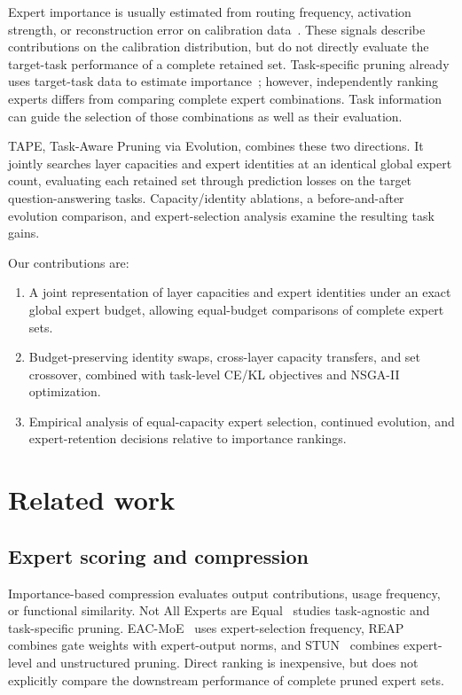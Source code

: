 \documentclass{article}
\begin{document}
Expert importance is usually estimated from routing frequency, activation strength, or reconstruction error on calibration data~\citep{ref1,ref3}. These signals describe contributions on the calibration distribution, but do not directly evaluate the target-task performance of a complete retained set. Task-specific pruning already uses target-task data to estimate importance~\citep{ref2,ref3}; however, independently ranking experts differs from comparing complete expert combinations. Task information can guide the selection of those combinations as well as their evaluation.

TAPE, Task-Aware Pruning via Evolution, combines these two directions. It jointly searches layer capacities and expert identities at an identical global expert count, evaluating each retained set through prediction losses on the target question-answering tasks. Capacity/identity ablations, a before-and-after evolution comparison, and expert-selection analysis examine the resulting task gains.

Our contributions are:
\begin{enumerate}
\item A joint representation of layer capacities and expert identities under an exact global expert budget, allowing equal-budget comparisons of complete expert sets.
\item Budget-preserving identity swaps, cross-layer capacity transfers, and set crossover, combined with task-level CE/KL objectives and NSGA-II optimization.
\item Empirical analysis of equal-capacity expert selection, continued evolution, and expert-retention decisions relative to importance rankings.
\end{enumerate}

\section{Related work}
\label{sec:2}
\subsection{Expert scoring and compression}
\label{sec:2.1}
Importance-based compression evaluates output contributions, usage frequency, or functional similarity. Not All Experts are Equal~\citep{ref2} studies task-agnostic and task-specific pruning. EAC-MoE~\citep{ref3} uses expert-selection frequency, REAP~\citep{ref1} combines gate weights with expert-output norms, and STUN~\citep{ref4} combines expert-level and unstructured pruning. Direct ranking is inexpensive, but does not explicitly compare the downstream performance of complete pruned expert sets.
\end{document}
